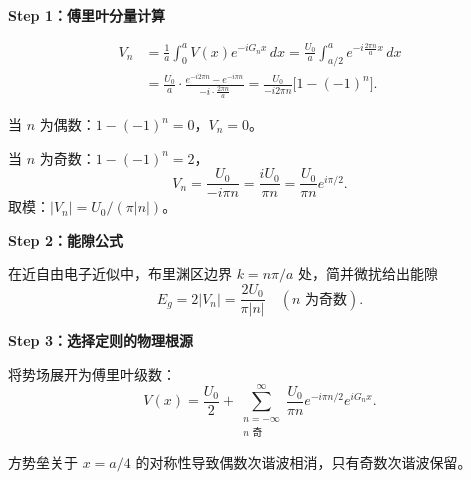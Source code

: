 \begin{derivationbox}
\textbf{Step 1：傅里叶分量计算}

\begin{align*}
V_n &=\frac{1}{a}\int_0^a V(x)e^{-iG_n x}\,dx
=\frac{U_0}{a}\int_{a/2}^{a}e^{-i\frac{2\pi n}{a}x}\,dx\\
&=\frac{U_0}{a}\cdot\frac{e^{-i2\pi n}-e^{-i\pi n}}{-i\cdot\frac{2\pi n}{a}}
=\frac{U_0}{-i2\pi n}\bigl[1-(-1)^n\bigr].
\end{align*}

当 $n$ 为偶数：$1-(-1)^n=0$，$V_n=0$。

当 $n$ 为奇数：$1-(-1)^n=2$，
\[
V_n=\frac{U_0}{-i\pi n}=\frac{iU_0}{\pi n}=\frac{U_0}{\pi n}e^{i\pi/2}.
\]
取模：$|V_n|=U_0/(\pi|n|)$。

\textbf{Step 2：能隙公式}

在近自由电子近似中，布里渊区边界 $k=n\pi/a$ 处，简并微扰给出能隙
\[
E_g=2|V_n|=\frac{2U_0}{\pi|n|}\quad(n\text{ 为奇数}).
\]

\textbf{Step 3：选择定则的物理根源}

将势场展开为傅里叶级数：
\[
V(x)=\frac{U_0}{2}+\sum_{\substack{n=-\infty\\ n\text{ 奇}}}^{\infty}\frac{U_0}{\pi n}e^{-i\pi n/2}e^{iG_n x}.
\]

方势垒关于 $x=a/4$ 的对称性导致偶数次谐波相消，只有奇数次谐波保留。
\end{derivationbox}

\vspace{1em}
